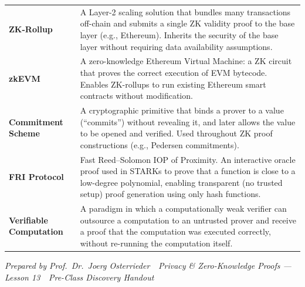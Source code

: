 \documentclass[11pt,a4paper]{article}
\begin{document}
\begin{tabular}{@{}p{3.8cm}p{10.8cm}@{}}
\textbf{ZK-Rollup}               & A Layer-2 scaling solution that bundles many transactions off-chain and submits a single ZK validity proof to the base layer (e.g., Ethereum). Inherits the security of the base layer without requiring data availability assumptions. \\
\textbf{zkEVM}                   & A zero-knowledge Ethereum Virtual Machine: a ZK circuit that proves the correct execution of EVM bytecode. Enables ZK-rollups to run existing Ethereum smart contracts without modification. \\
\textbf{Commitment Scheme}       & A cryptographic primitive that binds a prover to a value (``commits'') without revealing it, and later allows the value to be opened and verified. Used throughout ZK proof constructions (e.g., Pedersen commitments). \\
\textbf{FRI Protocol}            & Fast Reed--Solomon IOP of Proximity. An interactive oracle proof used in STARKs to prove that a function is close to a low-degree polynomial, enabling transparent (no trusted setup) proof generation using only hash functions. \\
\textbf{Verifiable Computation}  & A paradigm in which a computationally weak verifier can outsource a computation to an untrusted prover and receive a proof that the computation was executed correctly, without re-running the computation itself. \\
\bottomrule
\end{tabular}

\vspace{6pt}
\noindent\textcolor{mlgray}{\small\textit{Prepared by Prof.\ Dr.\ Joerg Osterrieder \,\textbullet\, Privacy \& Zero-Knowledge Proofs --- Lesson 13 \,\textbullet\, Pre-Class Discovery Handout}}
\end{document}

